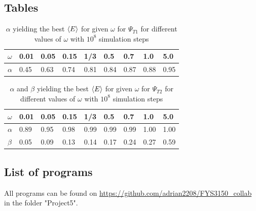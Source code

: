 \documentclass[10pt,a4paper]{article}
\begin{document}
\subsection{Tables}
\begin{table}[H]
\centering
\caption[$\alpha$ yielding the best $\braket{E}$ for given $\omega$]{$\alpha$ yielding the best $\braket{E}$ for given $\omega$ for $\Psi_{T1}$ for different values of $\omega$ with $10^8$ simulation steps }
\begin{tabular}{|l|l|l|l|l|l|l|l|l|}
\hline
$\omega$ & 0.01 & 0.05 & 0.15 & 1/3  & 0.5  & 0.7  & 1.0  & 5.0  \\ \hline
$\alpha$ & 0.45 & 0.63 & 0.74 & 0.81 & 0.84 & 0.87 & 0.88 & 0.95 \\ \hline
\end{tabular}
\end{table}
\begin{table}[H]
\centering
\caption[$\alpha$ and $\beta$ yielding the best $\braket{E}$ for given $\omega$]{$\alpha$ and $\beta$ yielding the best $\braket{E}$ for given $\omega$ for $\Psi_{T2}$ for different values of $\omega$ with $10^8$ simulation steps }
\begin{tabular}{|l|l|l|l|l|l|l|l|l|}
\hline
$\omega$ & 0.01 & 0.05 & 0.15 & 1/3  & 0.5  & 0.7  & 1.0  & 5.0  \\ \hline
$\alpha$ & 0.89 & 0.95 & 0.98 & 0.99 & 0.99 & 0.99 & 1.00 & 1.00 \\ \hline
$\beta$ & 0.05 & 0.09 & 0.13 & 0.14 & 0.17 & 0.24 & 0.27 & 0.59 \\ \hline

\end{tabular}
\end{table}

\subsection{List of programs}\label{Listofprograms}
All programs can be found on \url{https://github.com/adrian2208/FYS3150_collab} in the folder "Project5".
\end{document}
